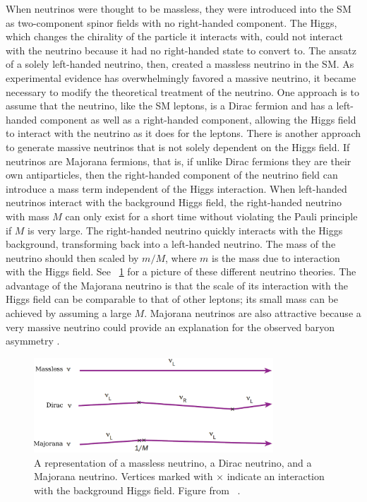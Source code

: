 When neutrinos were thought to be massless, they were introduced into the SM as two-component spinor fields with no right-handed component.  The Higgs, which changes the chirality of the particle it interacts with, could not interact with the neutrino because it had no right-handed state to convert to.  The ansatz of a solely left-handed neutrino, then, created a massless neutrino in the SM.  As experimental evidence has overwhelmingly favored a massive neutrino, it became necessary to modify the theoretical treatment of the neutrino.  One approach is to assume that the neutrino, like the SM leptons, is a Dirac fermion and has a left-handed component as well as a right-handed component, allowing the Higgs field to interact with the neutrino as it does for the leptons.  There is another approach to generate massive neutrinos that is not solely dependent on the Higgs field.  If neutrinos are Majorana fermions, that is, if unlike Dirac fermions they are their own antiparticles, then the right-handed component of the neutrino field can introduce a mass term independent of the Higgs interaction.  When left-handed neutrinos interact with the background Higgs field, the right-handed neutrino with mass $M$ can only exist for a short time without violating the Pauli principle if $M$ is very large.  The right-handed neutrino quickly interacts with the Higgs background, transforming back into a left-handed neutrino.  The mass of the neutrino should then scaled by $m/M$, where $m$ is the mass due to interaction with the Higgs field.  See {\fig}~\ref{fig:neutrinoMass} for a picture of these different neutrino theories.  The advantage of the Majorana neutrino is that the scale of its interaction with the Higgs field can be comparable to that of other leptons; its small mass can be achieved by assuming a large $M$.  Majorana neutrinos are also attractive because a very massive neutrino could provide an explanation for the observed baryon asymmetry \citep{baryogenesis_Fukugita}.  
\begin{figure}[htp]
\centering
\includegraphics[width=0.8\textwidth]{figures/neutrinoMass.eps}
\caption[A depiction of massless, Dirac, and Majorana models of the neutrino.]{A representation of a massless neutrino, a Dirac neutrino, and a Majorana neutrino.  Vertices marked with $\times$ indicate an interaction with the background Higgs field.  Figure from {}~\citep{neutrinoMass}.}
\label{fig:neutrinoMass}
\end{figure}  

